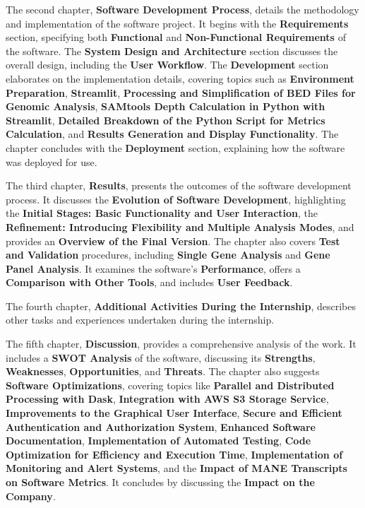 The second chapter, \textbf{Software Development Process}, details the methodology and implementation of the software project. It begins with the \textbf{Requirements} section, specifying both \textbf{Functional} and \textbf{Non-Functional Requirements} of the software. The \textbf{System Design and Architecture} section discusses the overall design, including the \textbf{User Workflow}. The \textbf{Development} section elaborates on the implementation details, covering topics such as \textbf{Environment Preparation}, \textbf{Streamlit}, \textbf{Processing and Simplification of BED Files for Genomic Analysis}, \textbf{SAMtools Depth Calculation in Python with Streamlit}, \textbf{Detailed Breakdown of the Python Script for Metrics Calculation}, and \textbf{Results Generation and Display Functionality}. The chapter concludes with the \textbf{Deployment} section, explaining how the software was deployed for use.

The third chapter, \textbf{Results}, presents the outcomes of the software development process. It discusses the \textbf{Evolution of Software Development}, highlighting the \textbf{Initial Stages: Basic Functionality and User Interaction}, the \textbf{Refinement: Introducing Flexibility and Multiple Analysis Modes}, and provides an \textbf{Overview of the Final Version}. The chapter also covers \textbf{Test and Validation} procedures, including \textbf{Single Gene Analysis} and \textbf{Gene Panel Analysis}. It examines the software's \textbf{Performance}, offers a \textbf{Comparison with Other Tools}, and includes \textbf{User Feedback}.

The fourth chapter, \textbf{Additional Activities During the Internship}, describes other tasks and experiences undertaken during the internship.

The fifth chapter, \textbf{Discussion}, provides a comprehensive analysis of the work. It includes a \textbf{SWOT Analysis} of the software, discussing its \textbf{Strengths}, \textbf{Weaknesses}, \textbf{Opportunities}, and \textbf{Threats}. The chapter also suggests \textbf{Software Optimizations}, covering topics like \textbf{Parallel and Distributed Processing with Dask}, \textbf{Integration with AWS S3 Storage Service}, \textbf{Improvements to the Graphical User Interface}, \textbf{Secure and Efficient Authentication and Authorization System}, \textbf{Enhanced Software Documentation}, \textbf{Implementation of Automated Testing}, \textbf{Code Optimization for Efficiency and Execution Time}, \textbf{Implementation of Monitoring and Alert Systems}, and the \textbf{Impact of MANE Transcripts on Software Metrics}. It concludes by discussing the \textbf{Impact on the Company}.

